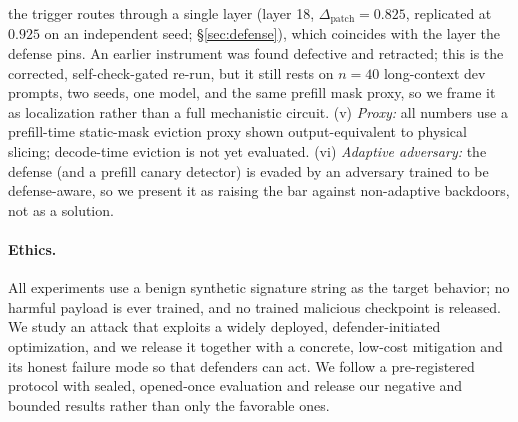 \documentclass[11pt]{article}
\begin{document}
the trigger routes through a single layer (layer 18, $\Delta_{\mathrm{patch}}=0.825$,
replicated at $0.925$ on an independent seed; \S\ref{sec:defense}), which coincides
with the layer the defense pins. An earlier instrument was found defective and
retracted; this is the corrected, self-check-gated re-run, but it still rests on
$n{=}40$ long-context dev prompts, two seeds, one model, and the same prefill mask
proxy, so we frame it as localization rather than a full mechanistic circuit. (v) \emph{Proxy:} all
numbers use a prefill-time static-mask eviction proxy shown output-equivalent to
physical slicing; decode-time eviction is not yet evaluated. (vi)
\emph{Adaptive adversary:} the defense (and a prefill canary detector) is evaded
by an adversary trained to be defense-aware, so we present it as raising the bar
against non-adaptive backdoors, not as a solution.

\paragraph{Ethics.}
All experiments use a benign synthetic signature string as the target behavior;
no harmful payload is ever trained, and no trained malicious checkpoint is
released. We study an attack that exploits a widely deployed, defender-initiated
optimization, and we release it together with a concrete, low-cost mitigation
and its honest failure mode so that defenders can act. We follow a
pre-registered protocol with sealed, opened-once evaluation and release our
negative and bounded results rather than only the favorable ones.



\end{document}
